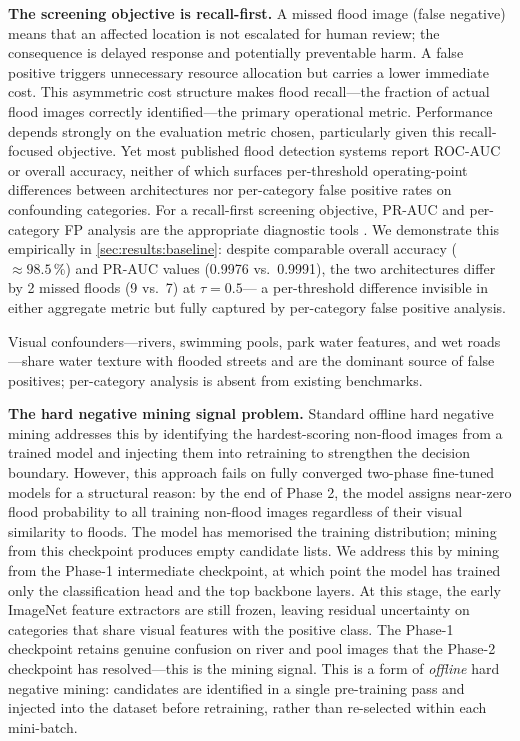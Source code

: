 \documentclass[a4paper,fleqn]{cas-sc}
\newcommand{\PR}{PR-AUC\xspace}
\begin{document}
\textbf{The screening objective is recall-first.}
A missed flood image (false negative) means that an affected location is not
escalated for human review; the consequence is delayed response and potentially
preventable harm.
A false positive triggers unnecessary resource allocation but carries a lower
immediate cost.
This asymmetric cost structure makes flood recall---the fraction of actual flood images correctly identified---the primary operational metric.
Performance depends strongly on the evaluation metric chosen, particularly given this recall-focused objective.
Yet most published flood detection systems report ROC-AUC or overall accuracy,
neither of which surfaces per-threshold operating-point differences between architectures
nor per-category false positive rates on confounding categories.
For a recall-first screening objective, \PR{} and per-category FP analysis are the
appropriate diagnostic tools \cite{Davis2006,Saito2015}.
We demonstrate this empirically in \cref{sec:results:baseline}: despite comparable
overall accuracy ($\approx 98.5\,\%$) and PR-AUC values (0.9976 vs.\ 0.9991),
the two architectures differ by 2 missed floods (9 vs.\ 7) at $\tau{=}0.5$---
a per-threshold difference invisible in either aggregate metric but fully
captured by per-category false positive analysis.

Visual confounders---rivers, swimming pools, park water features, and wet
roads---share water texture with flooded streets and are the dominant source
of false positives; per-category analysis is absent from existing benchmarks.

\textbf{The hard negative mining signal problem.}
Standard offline hard negative mining \cite{Viola2004,Shrivastava2016}
addresses this by identifying the hardest-scoring non-flood images from a
trained model and injecting them into retraining to strengthen the decision
boundary.
However, this approach fails on fully converged two-phase fine-tuned models for
a structural reason: by the end of Phase 2, the model assigns near-zero flood
probability to all training non-flood images regardless of their visual
similarity to floods.
The model has memorised the training distribution; mining from this checkpoint
produces empty candidate lists.
We address this by mining from the Phase-1 intermediate checkpoint, at which
point the model has trained only the classification head and the top backbone
layers.
At this stage, the early ImageNet feature extractors are still frozen, leaving
residual uncertainty on categories that share visual features with the positive
class.
The Phase-1 checkpoint retains genuine confusion on river and pool images that
the Phase-2 checkpoint has resolved---this is the mining signal.
This is a form of \emph{offline} hard negative mining: candidates are identified
in a single pre-training pass and injected into the dataset before retraining,
rather than re-selected within each mini-batch.
\end{document}
